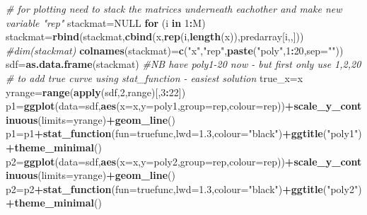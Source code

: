 \documentclass[]{article}
\newenvironment{Shaded}{\begin{snugshade}}{\end{snugshade}}
\newcommand{\CommentTok}[1]{\textcolor[rgb]{0.56,0.35,0.01}{\textit{#1}}}
\newcommand{\ControlFlowTok}[1]{\textcolor[rgb]{0.13,0.29,0.53}{\textbf{#1}}}
\newcommand{\DataTypeTok}[1]{\textcolor[rgb]{0.13,0.29,0.53}{#1}}
\newcommand{\DecValTok}[1]{\textcolor[rgb]{0.00,0.00,0.81}{#1}}
\newcommand{\FloatTok}[1]{\textcolor[rgb]{0.00,0.00,0.81}{#1}}
\newcommand{\KeywordTok}[1]{\textcolor[rgb]{0.13,0.29,0.53}{\textbf{#1}}}
\newcommand{\NormalTok}[1]{#1}
\newcommand{\OperatorTok}[1]{\textcolor[rgb]{0.81,0.36,0.00}{\textbf{#1}}}
\newcommand{\OtherTok}[1]{\textcolor[rgb]{0.56,0.35,0.01}{#1}}
\newcommand{\StringTok}[1]{\textcolor[rgb]{0.31,0.60,0.02}{#1}}
\begin{document}
\begin{Shaded}
\begin{Highlighting}[]
\CommentTok{# for plotting need to stack the matrices underneath eachother and make new variable "rep"}
\NormalTok{stackmat=}\OtherTok{NULL}
\ControlFlowTok{for}\NormalTok{ (i }\ControlFlowTok{in} \DecValTok{1}\OperatorTok{:}\NormalTok{M) stackmat=}\KeywordTok{rbind}\NormalTok{(stackmat,}\KeywordTok{cbind}\NormalTok{(x,}\KeywordTok{rep}\NormalTok{(i,}\KeywordTok{length}\NormalTok{(x)),predarray[i,,]))}
\CommentTok{#dim(stackmat)}
\KeywordTok{colnames}\NormalTok{(stackmat)=}\KeywordTok{c}\NormalTok{(}\StringTok{"x"}\NormalTok{,}\StringTok{"rep"}\NormalTok{,}\KeywordTok{paste}\NormalTok{(}\StringTok{"poly"}\NormalTok{,}\DecValTok{1}\OperatorTok{:}\DecValTok{20}\NormalTok{,}\DataTypeTok{sep=}\StringTok{""}\NormalTok{))}
\NormalTok{sdf=}\KeywordTok{as.data.frame}\NormalTok{(stackmat) }\CommentTok{#NB have poly1-20 now - but first only use 1,2,20}
\CommentTok{# to add true curve using stat_function - easiest solution}
\NormalTok{true_x=x}
\NormalTok{yrange=}\KeywordTok{range}\NormalTok{(}\KeywordTok{apply}\NormalTok{(sdf,}\DecValTok{2}\NormalTok{,range)[,}\DecValTok{3}\OperatorTok{:}\DecValTok{22}\NormalTok{])}
\NormalTok{p1=}\KeywordTok{ggplot}\NormalTok{(}\DataTypeTok{data=}\NormalTok{sdf,}\KeywordTok{aes}\NormalTok{(}\DataTypeTok{x=}\NormalTok{x,}\DataTypeTok{y=}\NormalTok{poly1,}\DataTypeTok{group=}\NormalTok{rep,}\DataTypeTok{colour=}\NormalTok{rep))}\OperatorTok{+}\KeywordTok{scale_y_continuous}\NormalTok{(}\DataTypeTok{limits=}\NormalTok{yrange)}\OperatorTok{+}\KeywordTok{geom_line}\NormalTok{()}
\NormalTok{p1=p1}\OperatorTok{+}\KeywordTok{stat_function}\NormalTok{(}\DataTypeTok{fun=}\NormalTok{truefunc,}\DataTypeTok{lwd=}\FloatTok{1.3}\NormalTok{,}\DataTypeTok{colour=}\StringTok{"black"}\NormalTok{)}\OperatorTok{+}\KeywordTok{ggtitle}\NormalTok{(}\StringTok{"poly1"}\NormalTok{)}\OperatorTok{+}\KeywordTok{theme_minimal}\NormalTok{()}
\NormalTok{p2=}\KeywordTok{ggplot}\NormalTok{(}\DataTypeTok{data=}\NormalTok{sdf,}\KeywordTok{aes}\NormalTok{(}\DataTypeTok{x=}\NormalTok{x,}\DataTypeTok{y=}\NormalTok{poly2,}\DataTypeTok{group=}\NormalTok{rep,}\DataTypeTok{colour=}\NormalTok{rep))}\OperatorTok{+}\KeywordTok{scale_y_continuous}\NormalTok{(}\DataTypeTok{limits=}\NormalTok{yrange)}\OperatorTok{+}\KeywordTok{geom_line}\NormalTok{()}
\NormalTok{p2=p2}\OperatorTok{+}\KeywordTok{stat_function}\NormalTok{(}\DataTypeTok{fun=}\NormalTok{truefunc,}\DataTypeTok{lwd=}\FloatTok{1.3}\NormalTok{,}\DataTypeTok{colour=}\StringTok{"black"}\NormalTok{)}\OperatorTok{+}\KeywordTok{ggtitle}\NormalTok{(}\StringTok{"poly2"}\NormalTok{)}\OperatorTok{+}\KeywordTok{theme_minimal}\NormalTok{()}

\end{Highlighting}
\end{Shaded}
\end{document}
